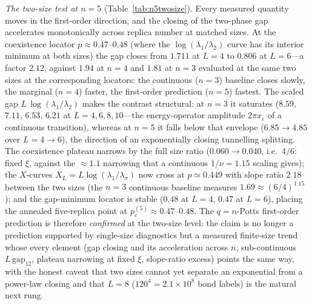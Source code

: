 \documentclass[aps,prx,reprint,superscriptaddress,nobibnotes,longbibliography]{revtex4-2}
\theoremstyle{remark}
\begin{document}
\emph{The two-size test at $n=5$} (Table~\ref{tab:n5twosize}).  Every
measured quantity moves in the first-order direction, and the closing of
the two-phase gap accelerates monotonically across replica number at
matched sizes.  At the coexistence locator $p\approx0.47$--$0.48$ (where
the $\log(\lambda_1/\lambda_2)$ curve has its interior minimum at both
sizes) the gap closes from $1.711$ at $L=4$ to $0.806$ at $L=6$---a
factor $2.12$, against $1.94$ at $n=4$ and $1.81$ at $n=3$ evaluated at
the same two sizes at the corresponding locators: the continuous ($n=3$)
baseline closes slowly, the marginal ($n=4$) faster, the first-order
prediction ($n=5$) fastest.  The scaled gap
$L\,\log(\lambda_1/\lambda_2)$ makes the contrast structural: at
$n=3$ it saturates ($8.59$, $7.11$, $6.53$, $6.21$ at $L=4,6,8,10$---the
energy-operator amplitude $2\pi x_\varepsilon$ of a continuous
transition), whereas at $n=5$ it falls below that envelope
($6.85\to4.85$ over $L=4\to6$), the direction of an exponentially
closing tunnelling splitting.  The coexistence plateau narrows by the
full size ratio ($0.060\to0.040$, i.e.\ $4/6$: fixed $\xi$, against
the $\approx1.1$ narrowing that a continuous $1/\nu=1.15$ scaling
gives); the $X$-curves $X_L=L\log(\lambda_1/\lambda_\sigma)$ now
cross at $p\simeq0.449$ with slope ratio $2.18$ between the two sizes
(the $n=3$ continuous baseline measures $1.69\approx(6/4)^{1.15}$); and
the gap-minimum locator is stable ($0.48$ at $L=4$, $0.47$ at $L=6$),
placing the annealed five-replica point at $p_c^{(5)}\approx0.47$--$0.48$.
The $q=n$-Potts first-order prediction is therefore \emph{confirmed} at
the two-size level: the claim is no longer a prediction supported by
single-size diagnostics but a measured finite-size trend whose every
element (gap closing and its acceleration across $n$, sub-continuous
$L\,\mathrm{gap}_{12}$, plateau narrowing at fixed $\xi$,
slope-ratio excess) points the same way, with the honest caveat that two
sizes cannot yet separate an exponential from a power-law closing and
that $L=8$ ($120^4=2.1\times10^8$ bond labels) is the natural next
rung.
\end{document}
